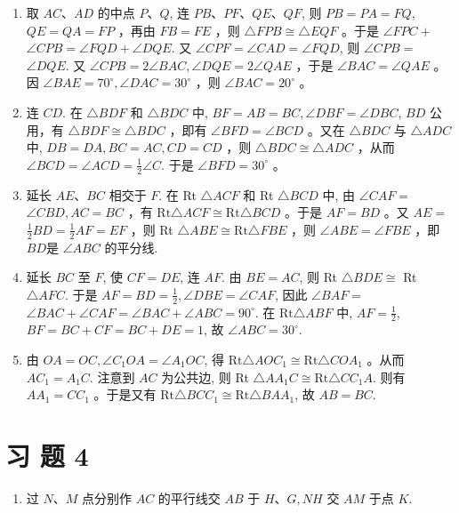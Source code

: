 \documentclass[10pt]{article}
\begin{document}
\begin{enumerate}
  \item 取 $A C 、 A D$ 的中点 $P 、 Q$, 连 $P B 、 P F 、 Q E 、 Q F$, 则 $P B=P A=F Q$, $Q E=Q A=F P$ ，再由 $F B=F E$ ，则 $\triangle F P B \cong \triangle E Q F$ 。于是 $\angle F P C+$ $\angle C P B=\angle F Q D+\angle D Q E$. 又 $\angle C P F=\angle C A D=\angle F Q D$, 则 $\angle C P B=$ $\angle D Q E$. 又 $\angle C P B=2 \angle B A C, \angle D Q E=2 \angle Q A E$ ，于是 $\angle B A C=\angle Q A E$ 。因 $\angle B A E=70^{\circ}, \angle D A C=30^{\circ}$ ，则 $\angle B A C=20^{\circ}$ 。
  \item 连 $C D$. 在 $\triangle B D F$ 和 $\triangle B D C$ 中, $B F=A B=B C, \angle D B F=\angle D B C$, $B D$ 公用，有 $\triangle B D F \cong \triangle B D C$ ，即有 $\angle B F D=\angle B C D$ 。又在 $\triangle B D C$ 与 $\triangle A D C$ 中, $D B=D A, B C=A C, C D=C D$ ，则 $\triangle B D C \cong \triangle A D C$ ，从而 $\angle B C D=\angle A C D=\frac{1}{2} \angle C$. 于是 $\angle B F D=30^{\circ}$ 。
  \item 延长 $A E 、 B C$ 相交于 $F$. 在 Rt $\triangle A C F$ 和 Rt $\triangle B C D$ 中, 由 $\angle C A F=$ $\angle C B D, A C=B C$ ，有 $\mathrm{Rt} \triangle A C F \cong \mathrm{Rt} \triangle B C D$ 。于是 $A F=B D$ 。又 $A E=$ $\frac{1}{2} B D=\frac{1}{2} A F=E F$ ，则 Rt $\triangle A B E \cong \mathrm{Rt} \triangle F B E$ ，则 $\angle A B E=\angle F B E$ ，即 $B D$是 $\angle A B C$ 的平分线.
  \item 延长 $B C$ 至 $F$, 使 $C F=D E$, 连 $A F$. 由 $B E=A C$, 则 Rt $\triangle B D E \cong$ Rt $\triangle A F C$. 于是 $A F=B D=\frac{1}{2}, \angle D B E=\angle C A F$, 因此 $\angle B A F=$ $\angle B A C+\angle C A F=\angle B A C+\angle A B C=90^{\circ}$. 在 $\mathrm{Rt} \triangle A B F$ 中, $A F=\frac{1}{2}$, $B F=B C+C F=B C+D E=1$, 故 $\angle A B C=30^{\circ}$.
  \item 由 $O A=O C, \angle C_{1} O A=\angle A_{1} O C$, 得 $\mathrm{Rt} \triangle A O C_{1} \cong \mathrm{Rt} \triangle C O A_{1}$ 。从而 $A C_{1}=A_{1} C$. 注意到 $A C$ 为公共边, 则 Rt $\triangle A A_{1} C \cong \mathrm{Rt} \triangle C C_{1} A$. 则有 $A A_{1}=C C_{1}$ 。于是又有 $\mathrm{Rt} \triangle B C C_{1} \cong \mathrm{Rt} \triangle B A A_{1}$, 故 $A B=B C$.
\end{enumerate}

\section*{习 题 4}
\begin{enumerate}
  \item 过 $N 、 M$ 点分别作 $A C$ 的平行线交 $A B$ 于 $H 、 G, N H$ 交 $A M$ 于点 $K$.
\end{enumerate}
\end{document}
